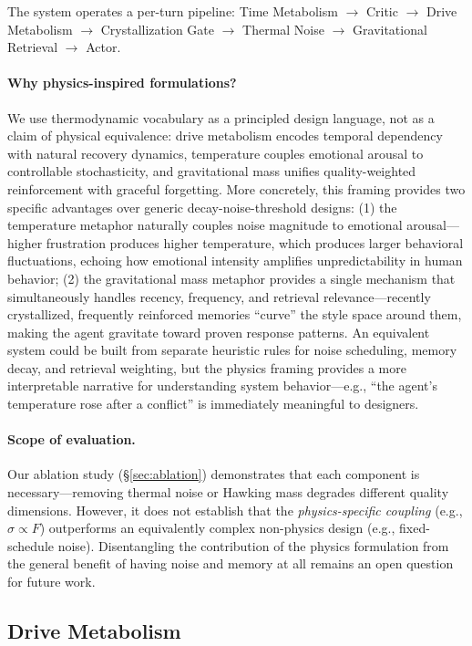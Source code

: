 The system operates a per-turn pipeline: Time Metabolism $\rightarrow$ Critic $\rightarrow$ Drive Metabolism $\rightarrow$ Crystallization Gate $\rightarrow$ Thermal Noise $\rightarrow$ Gravitational Retrieval $\rightarrow$ Actor.

\paragraph{Why physics-inspired formulations?} We use thermodynamic vocabulary as a principled design language, not as a claim of physical equivalence: drive metabolism encodes temporal dependency with natural recovery dynamics, temperature couples emotional arousal to controllable stochasticity, and gravitational mass unifies quality-weighted reinforcement with graceful forgetting. More concretely, this framing provides two specific advantages over generic decay-noise-threshold designs: (1) the temperature metaphor naturally couples noise magnitude to emotional arousal---higher frustration produces higher temperature, which produces larger behavioral fluctuations, echoing how emotional intensity amplifies unpredictability in human behavior; (2) the gravitational mass metaphor provides a single mechanism that simultaneously handles recency, frequency, and retrieval relevance---recently crystallized, frequently reinforced memories ``curve'' the style space around them, making the agent gravitate toward proven response patterns. An equivalent system could be built from separate heuristic rules for noise scheduling, memory decay, and retrieval weighting, but the physics framing provides a more interpretable narrative for understanding system behavior---e.g., ``the agent's temperature rose after a conflict'' is immediately meaningful to designers.

\paragraph{Scope of evaluation.} Our ablation study (\S\ref{sec:ablation}) demonstrates that each component is necessary---removing thermal noise or Hawking mass degrades different quality dimensions. However, it does not establish that the \emph{physics-specific coupling} (e.g., $\sigma \propto F$) outperforms an equivalently complex non-physics design (e.g., fixed-schedule noise). Disentangling the contribution of the physics formulation from the general benefit of having noise and memory at all remains an open question for future work.

\subsection{Drive Metabolism}

